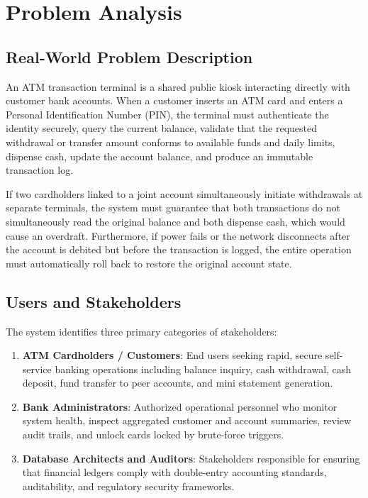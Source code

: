 \documentclass[11pt,a4paper]{report}
\begin{document}
\newpage

\section{Problem Analysis}

\subsection{Real-World Problem Description}
An ATM transaction terminal is a shared public kiosk interacting directly with customer bank accounts. When a customer inserts an ATM card and enters a Personal Identification Number (PIN), the terminal must authenticate the identity securely, query the current balance, validate that the requested withdrawal or transfer amount conforms to available funds and daily limits, dispense cash, update the account balance, and produce an immutable transaction log.

If two cardholders linked to a joint account simultaneously initiate withdrawals at separate terminals, the system must guarantee that both transactions do not simultaneously read the original balance and both dispense cash, which would cause an overdraft. Furthermore, if power fails or the network disconnects after the account is debited but before the transaction is logged, the entire operation must automatically roll back to restore the original account state.

\subsection{Users and Stakeholders}
The system identifies three primary categories of stakeholders:
\begin{enumerate}
    \item \textbf{ATM Cardholders / Customers}: End users seeking rapid, secure self-service banking operations including balance inquiry, cash withdrawal, cash deposit, fund transfer to peer accounts, and mini statement generation.
    \item \textbf{Bank Administrators}: Authorized operational personnel who monitor system health, inspect aggregated customer and account summaries, review audit trails, and unlock cards locked by brute-force triggers.
    \item \textbf{Database Architects and Auditors}: Stakeholders responsible for ensuring that financial ledgers comply with double-entry accounting standards, auditability, and regulatory security frameworks.
\end{enumerate}
\end{document}
